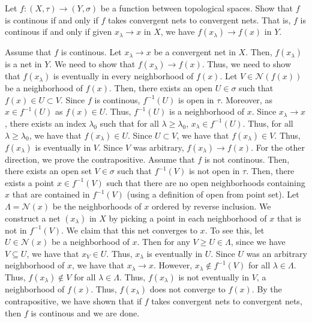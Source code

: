 \documentclass[12pt]{article}
\begin{document}
\begin{problem}{48}
    Let $f: (X, \tau) \to (Y, \sigma)$ be a function between topological spaces. Show that $f$ is continous if and only if $f$ takes convergent nets to convergent nets. That is, $f$ is continous if and only if given $x_\lambda \to x$ in $X$, we have $f(x_\lambda) \to f(x)$ in $Y$. 
\end{problem}
\begin{solution}
    Assume that $f$ is continous. Let $x_\lambda \to x$ be a convergent net in $X$. Then, $f(x_\lambda)$ is a net in $Y$. We need to show that $f(x_\lambda) \to f(x)$. Thus, we need to show that $f(x_\lambda)$ is eventually in every neighborhood of $f(x)$. \bbni
    Let $V \in \mathcal N(f(x))$ be a neighborhood of $f(x)$. Then, there exists an open $U \in \sigma$ such that $f(x) \in U \subset V$. Since $f$ is continous, $f^{-1}(U)$ is open in $\tau$. Moreover, as $x \in f^{-1}(U)$ as $f(x) \in U$. Thus, $f^{-1}(U)$ is a neighborhood of $x$. Since $x_\lambda \to x$, there exists an index $\lambda_0$ such that for all $\lambda \geq \lambda_0$, $x_\lambda \in f^{-1}(U)$. Thus, for all $\lambda \geq \lambda_0$, we have that $f(x_\lambda) \in U$. Since $U \subset V$, we have that $f(x_\lambda) \in V$. Thus, $f(x_\lambda)$ is eventually in $V$. Since $V$ was arbitrary, $f(x_\lambda) \to f(x)$. \bbni
    For the other direction, we prove the contrapositive. Assume that $f$ is not continous. Then, there exists an open set $V \in \sigma$ such that $f^{-1}(V)$ is not open in $\tau$. Then, there exists a point $x \in f^{-1}(V)$ such that there are no open neighborhoods containing $x$ that are contained in $f^{-1}(V)$ (using a definition of open from point set). \bbni 
    Let $\Lambda = \mathcal N(x)$ be the neighborhoods of $x$ ordered by reverse inclusion. We construct a net $(x_\lambda)$ in $X$ by picking a point in each neighborhood of $x$ that is not in $f^{-1}(V)$. We claim that this net converges to $x$. To see this, let $U \in \mathcal N(x)$ be a neighborhood of $x$. Then for any $V \geq U \in \Lambda$, since we have $V \subseteq U$, we have that $x_V \in U$. Thus, $x_\lambda$ is eventually in $U$. Since $U$ was an arbitrary neighborhood of $x$, we have that $x_\lambda \to x$. \bbni  
    However, $x_\lambda \not \in  f^{-1}(V)$ for all $\lambda \in \Lambda$. Thus, $f(x_\lambda) \not \in V$ for all $\lambda \in \Lambda$. Thus, $f(x_\lambda)$ is not eventually in $V$, a neighborhood of $f(x)$. Thus, $f(x_\lambda)$ does not converge to $f(x)$. \bbni
    By the contrapositive, we have shown that if $f$ takes convergent nets to convergent nets, then $f$ is continous and we are done.
\end{solution}
\newpage
\end{document}
